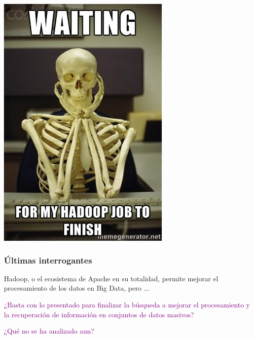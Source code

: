 \documentclass[
10pt, %
aspectratio=169, %
]{beamer}
\begin{document}
	\begin{frame}
		
		\centering
		\includegraphics[height=\paperheight]{break1.jpg}
		
	\end{frame}
	
	\begin{frame}
		
		\frametitle{Últimas interrogantes}
		
		Hadoop, o el ecosistema de Apache en su totalidad, permite mejorar el procesamiento de los datos en Big Data, pero ... 
		
		\vspace{2\baselineskip}
				
		\textcolor{purple}{¿Basta con lo presentado para finalizar la búsqueda a mejorar el procesamiento y la recuperación de información en conjuntos de datos masivos?}
		
		\vspace{1\baselineskip}
		
		\textcolor{purple}{¿Qué no se ha analizado aun?}
		
		
	\end{frame}
	
\end{document}
